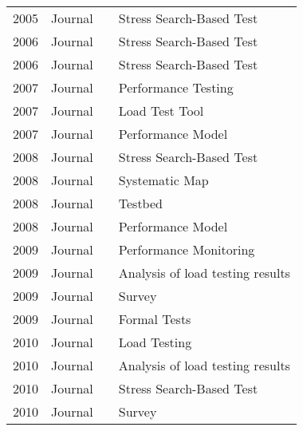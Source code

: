 \begin{longtable}{llll}
2005          & Journal          & \cite{Pohlheim2005}             & Stress Search-Based Test         \\
2006          & Journal          & \cite{Garousi2006}              & Stress Search-Based Test         \\
2006          & Journal          & \cite{Garousi2006}\cite{Ag2006} & Stress Search-Based Test         \\
2007          & Journal          & \cite{Cai2007}                  & Performance Testing              \\
2007          & Journal          & \cite{Nevedrov2007}             & Load Test Tool                   \\
2007          & Journal          & \cite{Fritzsche2007}            & Performance Model                \\
2008          & Journal          & \cite{Bayan2008}                & Stress Search-Based Test         \\
2008          & Journal          & \cite{Afzal2008}                & Systematic Map                   \\
2008          & Journal          & \cite{Bertolino2008}            & Testbed                          \\
2008          & Journal          & \cite{Lutteroth2008}            & Performance Model                \\
2009          & Journal          & \cite{Acharya2009}              & Performance Monitoring           \\
2009          & Journal          & \cite{Jiang2009a}               & Analysis of load testing results \\
2009          & Journal          & \cite{Afzal2009a}               & Survey                           \\
2009          & Journal          & \cite{Hierons2009}              & Formal Tests                     \\
2010          & Journal          & \cite{Wang2010}                 & Load Testing                     \\
2010          & Journal          & \cite{Malik2010b}               & Analysis of load testing results \\
2010          & Journal          & \cite{Garousi2010}             & Stress Search-Based Test         \\
2010          & Journal          & \cite{White2010}                & Survey                           \\

\end{longtable}
